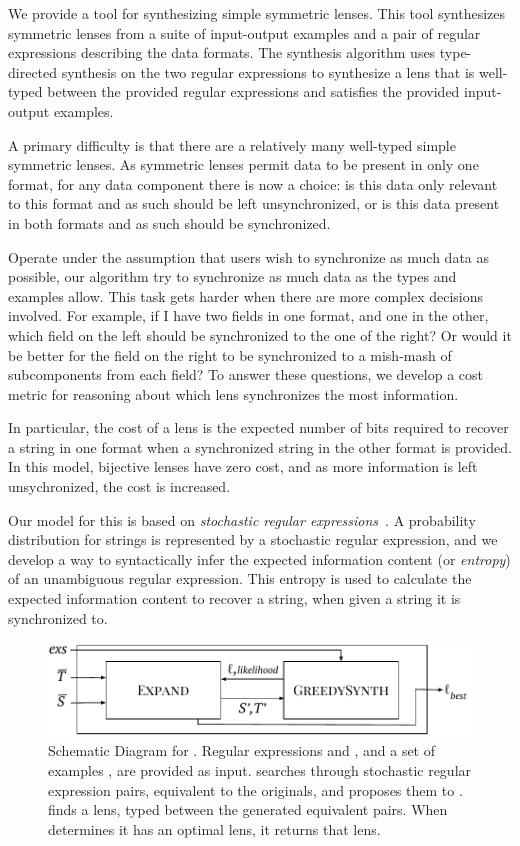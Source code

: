 \documentclass[acmsmall,screen,anonymous]{acmart}
\begin{document}
We provide a tool for synthesizing simple symmetric lenses. This tool
synthesizes symmetric lenses from a suite of input-output examples and a pair of
regular expressions describing the data formats. The synthesis algorithm uses
type-directed synthesis on the two regular expressions to synthesize a lens that
is well-typed between the provided regular expressions and satisfies the
provided input-output examples.

A primary difficulty is that there are a relatively many well-typed simple
symmetric lenses. As symmetric lenses permit data to be present in only one
format, for any data component there is now a choice: is this data only relevant
to this format and as such should be left unsynchronized, or is this data
present in both formats and as such should be synchronized.

Operate under the assumption that users wish to synchronize as much data as
possible, our algorithm try to synchronize as much data as the types and
examples allow. This task gets harder when there are more complex decisions
involved. For example, if I have two fields in one format, and one in the other,
which field on the left should be synchronized to the one of the right? Or would
it be better for the field on the right to be synchronized to a mish-mash of
subcomponents from each field? To answer these questions, we develop a cost
metric for reasoning about which lens synchronizes the most information.

In particular, the cost of a lens is the expected number of bits required to
recover a string in one format when a synchronized string in the other format is
provided. In this model, bijective lenses have zero cost, and as more
information is left unsychronized, the cost is increased.

Our model for this is based on \emph{stochastic regular expressions}~\cite{?}. A
probability distribution for strings is represented by a stochastic regular
expression, and we develop a way to syntactically infer the expected information
content (or \emph{entropy}) of an unambiguous regular expression. This entropy
is used to calculate the expected information content to recover a string, when
given a string it is synchronized to.

\begin{figure}
  \includegraphics[width=.5\textwidth]{high-level-algorithm.pdf}
  \caption{Schematic Diagram for \SOptician. Regular expressions \Regex and
    \RegexAlt, and a set of examples \Examples, are provided as input. \RXSearch
    searches through stochastic regular expression pairs, equivalent to the
    originals, and proposes them to \GreedySynth. \GreedySynth finds a lens,
    typed between the generated equivalent pairs. When \RXSearch determines it
    has an optimal lens, it returns that lens.}
  \label{fig:high-level-algorithm}
\end{figure}
\end{document}

